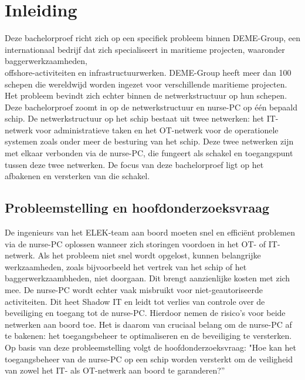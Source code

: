 


% 

\section{Inleiding}%
\label{sec:inleiding}
Deze bachelorproef richt zich op een specifiek probleem binnen DEME-Group, een internationaal bedrijf dat zich specialiseert in maritieme projecten, waaronder 
baggerwerkzaamheden, \\offshore-activiteiten en infrastructuurwerken. DEME-Group heeft meer dan 100 schepen die wereldwijd worden ingezet voor verschillende maritieme projecten. Het probleem 
bevindt zich echter binnen de netwerkstructuur op hun schepen. Deze bachelorproef zoomt in op de netwerkstructuur en nurse-PC op één bepaald schip. De netwerkstructuur op het schip bestaat uit twee netwerken: het IT-netwerk voor administratieve taken 
en het OT-netwerk voor de operationele systemen zoals onder meer de besturing van het schip. Deze twee netwerken zijn met elkaar verbonden via de nurse-PC, 
die fungeert als schakel en toegangspunt tussen deze twee netwerken. De focus van deze bachelorproef ligt op het afbakenen en versterken van die schakel.

\subsection{Probleemstelling en hoofdonderzoeksvraag}
De ingenieurs van het ELEK-team aan boord moeten snel en efficiënt problemen via de nurse-PC oplossen wanneer zich storingen voordoen in het OT- of  IT-netwerk.  
Als het probleem niet snel wordt opgelost, kunnen belangrijke werkzaamheden, zoals bijvoorbeeld het vertrek van het schip of het baggerwerkzaambheden, niet doorgaan. 
Dit brengt aanzienlijke kosten met zich mee. De nurse-PC wordt echter vaak misbruikt voor niet-geautoriseerde activiteiten. Dit heet Shadow IT en leidt tot verlies van controle 
over de beveiliging en toegang tot de nurse-PC.  Hierdoor nemen de risico’s voor beide netwerken aan boord toe. Het is daarom van cruciaal belang om de nurse-PC af 
te bakenen: het toegangsbeheer te optimaliseren en de beveiliging te versterken. Op basis van deze probleemstelling volgt de hoofdonderzoeksvraag: 
"Hoe kan het toegangsbeheer van de nurse-PC op een schip worden versterkt om de veiligheid van zowel het IT- als OT-netwerk aan boord te garanderen?” 

